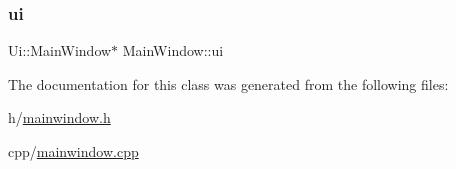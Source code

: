 \mbox{\label{class_main_window_a35466a70ed47252a0191168126a352a5}} 
\subsubsection{\texorpdfstring{ui}{ui}}
{\footnotesize\ttfamily Ui\+::\+Main\+Window$\ast$ Main\+Window\+::ui\hspace{0.3cm}{\ttfamily [private]}}



The documentation for this class was generated from the following files\+:\begin{DoxyCompactItemize}
\item 
h/\mbox{\hyperlink{mainwindow_8h}{mainwindow.\+h}}\item 
cpp/\mbox{\hyperlink{mainwindow_8cpp}{mainwindow.\+cpp}}\end{DoxyCompactItemize}
